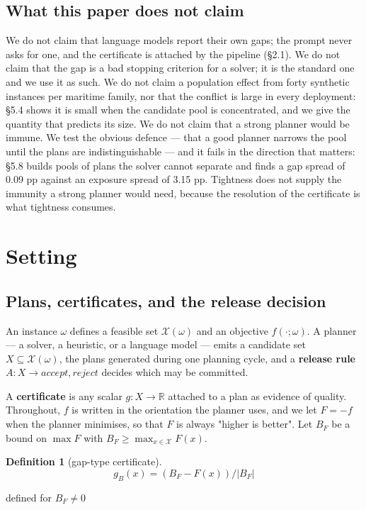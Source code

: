 \documentclass[preprint,12pt,letterpaper]{elsarticle}
\theoremstyle{definition}
\newtheorem{definition}{Definition}
\theoremstyle{plain}
\begin{document}
\subsection{What this paper does not claim}

We do not claim that language models report their own gaps; the prompt never asks for one, and the certificate is attached by the pipeline (\S 2.1). We do not claim that the gap is a bad stopping criterion for a solver; it is the standard one and we use it as such. We do not claim a population effect from forty synthetic instances per maritime family, nor that the conflict is large in every deployment: \S 5.4 shows it is small when the candidate pool is concentrated, and we give the quantity that predicts its size. We do not claim that a strong planner would be immune. We test the obvious defence --- that a good planner narrows the pool until the plans are indistinguishable --- and it fails in the direction that matters: \S 5.8 builds pools of plans the solver cannot separate and finds a gap spread of 0.09 pp against an exposure spread of 3.15 pp. Tightness does not supply the immunity a strong planner would need, because the resolution of the certificate is what tightness consumes.

\section{Setting}

\subsection{Plans, certificates, and the release decision}

An instance $\omega$ defines a feasible set $\mathcal{X}(\omega)$ and an objective $f(\cdot; \omega)$. A planner --- a solver, a heuristic, or a language model --- emits a candidate set $X \subseteq \mathcal{X}(\omega)$, the plans generated during one planning cycle, and a \textbf{release rule} $A: X \to {accept, reject}$ decides which may be committed.

A \textbf{certificate} is any scalar $g: X \to \mathbb{R}$ attached to a plan as evidence of quality. Throughout, $f$ is written in the orientation the planner uses, and we let $F = -f$ when the planner minimises, so that $F$ is always "higher is better". Let $B_{F}$ be a bound on $\max F$ with $B_{F} \ge \max _{x\in \mathcal{X}} F(x)$.

\begin{definition}[gap-type certificate]
\begin{equation}
\tag{1}
g_{B}(x) = (B_{F} - F(x)) / |B_{F}|
\end{equation}

defined for $B_{F} \neq 0$
\end{definition}
\end{document}
